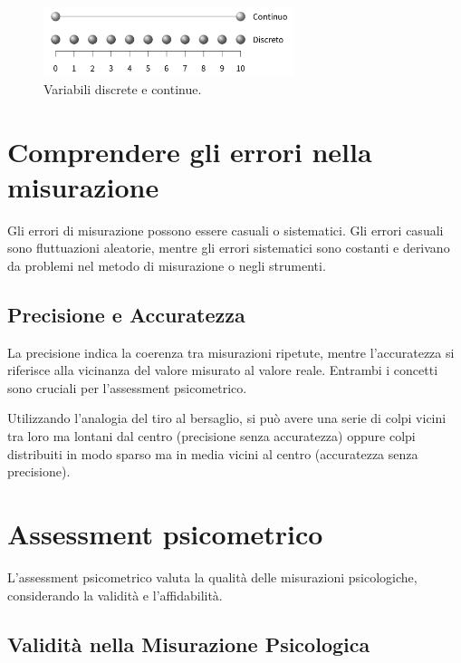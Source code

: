 \documentclass[
  letterpaper,
  krantz2]{{[}./krantz{]}}
\begin{document}
\begin{figure}[H]

{\centering \includegraphics[width=0.65\textwidth,height=\textheight]{chapters/key_notions/../../figures/misurazione_3.png}

}

\caption{Variabili discrete e continue.}

\end{figure}%

\section{Comprendere gli errori nella
misurazione}\label{comprendere-gli-errori-nella-misurazione}

Gli errori di misurazione possono essere casuali o sistematici. Gli
errori casuali sono fluttuazioni aleatorie, mentre gli errori
sistematici sono costanti e derivano da problemi nel metodo di
misurazione o negli strumenti.

\subsection{Precisione e Accuratezza}\label{precisione-e-accuratezza}

La precisione indica la coerenza tra misurazioni ripetute, mentre
l'accuratezza si riferisce alla vicinanza del valore misurato al valore
reale. Entrambi i concetti sono cruciali per l'assessment psicometrico.

Utilizzando l'analogia del tiro al bersaglio, si può avere una serie di
colpi vicini tra loro ma lontani dal centro (precisione senza
accuratezza) oppure colpi distribuiti in modo sparso ma in media vicini
al centro (accuratezza senza precisione).

\section{Assessment psicometrico}\label{assessment-psicometrico}

L'assessment psicometrico valuta la qualità delle misurazioni
psicologiche, considerando la validità e l'affidabilità.

\subsection{Validità nella Misurazione
Psicologica}\label{validituxe0-nella-misurazione-psicologica}
\end{document}
